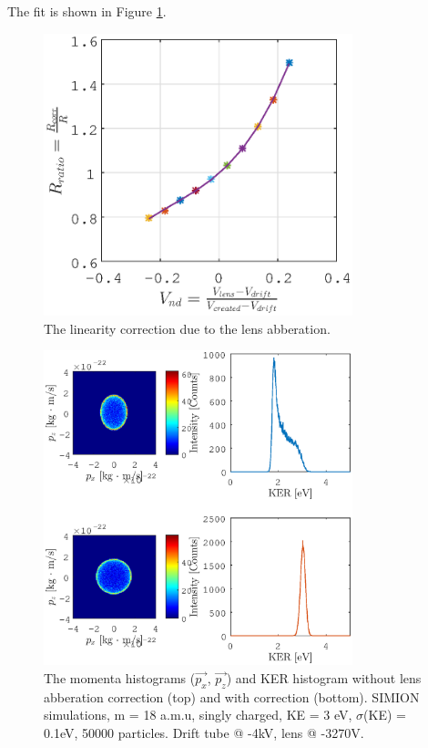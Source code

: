 The fit is shown in Figure \ref{dR_correction_fit}.

\begin{figure}[h]
   \centering
    \centerline{\includegraphics[width=0.8\textwidth]{Graphics/dR_correction_fit.eps}}
\caption{The linearity correction due to the lens abberation.}
\label{dR_correction_fit}
\end{figure}

\begin{figure}[h]
   \centering
    \centerline{\includegraphics[width=0.8\textwidth]{Graphics/SIMION_lens_corr_both.eps}}
\caption{The momenta histograms ($\vec{p_x}$, $\vec{p_z}$) and KER histogram without lens abberation correction (top) and with correction (bottom). SIMION simulations, m = 18 a.m.u, singly charged, KE = 3 eV, $\sigma$(KE) = 0.1eV, 50000 particles. Drift tube @ -4kV, lens @ -3270V.}
\label{SIMION_lens_corr_both}
\end{figure}

